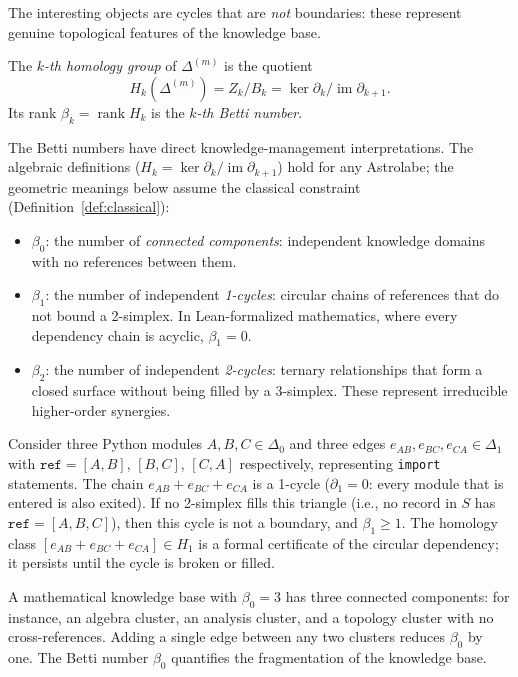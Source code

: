 The interesting objects are cycles that are \emph{not} boundaries: these represent genuine topological features of the knowledge base.

\begin{definition}[Homology]
\label{def:homology}
The \emph{$k$-th homology group} of $\Delta^{(m)}$ is the quotient
\[
H_k(\Delta^{(m)}) = Z_k / B_k = \ker \partial_k / \operatorname{im} \partial_{k+1}.
\]
Its rank $\beta_k = \operatorname{rank} H_k$ is the \emph{$k$-th Betti number}.
\end{definition}

The Betti numbers have direct knowledge-management interpretations. The algebraic definitions ($H_k = \ker \partial_k / \operatorname{im} \partial_{k+1}$) hold for any Astrolabe; the geometric meanings below assume the classical constraint (Definition~\ref{def:classical}):

\begin{itemize}
\item $\beta_0$: the number of \emph{connected components}: independent knowledge domains with no references between them.
\item $\beta_1$: the number of independent \emph{1-cycles}: circular chains of references that do not bound a 2-simplex. In Lean-formalized mathematics, where every dependency chain is acyclic, $\beta_1 = 0$.
\item $\beta_2$: the number of independent \emph{2-cycles}: ternary relationships that form a closed surface without being filled by a 3-simplex. These represent irreducible higher-order synergies.
\end{itemize}

\begin{example}
Consider three Python modules $A, B, C \in \Delta_0$ and three edges $e_{AB}, e_{BC}, e_{CA} \in \Delta_1$ with $\texttt{ref} = [A, B]$, $[B, C]$, $[C, A]$ respectively, representing \texttt{import} statements. The chain $e_{AB} + e_{BC} + e_{CA}$ is a 1-cycle ($\partial_1 = 0$: every module that is entered is also exited). If no 2-simplex fills this triangle (i.e., no record in $S$ has $\texttt{ref} = [A, B, C]$), then this cycle is not a boundary, and $\beta_1 \geq 1$. The homology class $[e_{AB} + e_{BC} + e_{CA}] \in H_1$ is a formal certificate of the circular dependency; it persists until the cycle is broken or filled.
\end{example}

\begin{example}
A mathematical knowledge base with $\beta_0 = 3$ has three connected components: for instance, an algebra cluster, an analysis cluster, and a topology cluster with no cross-references. Adding a single edge between any two clusters reduces $\beta_0$ by one. The Betti number $\beta_0$ quantifies the fragmentation of the knowledge base.
\end{example}

